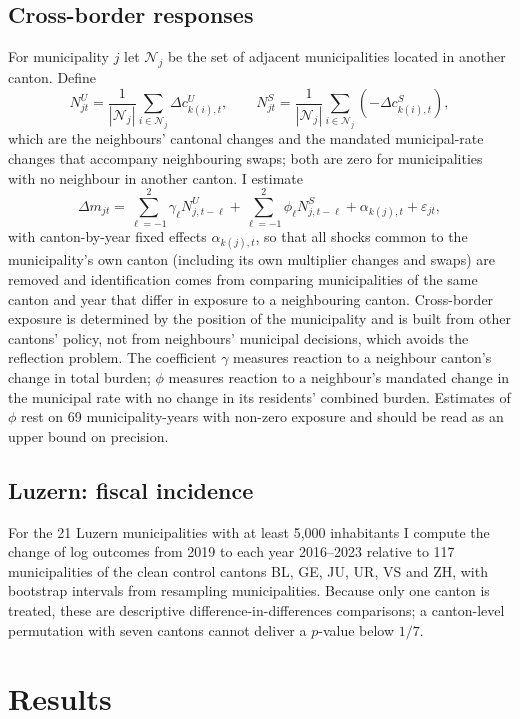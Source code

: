 \documentclass[11pt,a4paper]{article}
\begin{document}
\subsection{Cross-border responses}
For municipality $j$ let $\mathcal N_j$ be the set of adjacent municipalities located in another canton. Define
\[
N^{U}_{jt}=\frac{1}{|\mathcal N_j|}\sum_{i\in\mathcal N_j}\Delta c^{U}_{k(i),t},\qquad N^{S}_{jt}=\frac{1}{|\mathcal N_j|}\sum_{i\in\mathcal N_j}\left(-\Delta c^{S}_{k(i),t}\right),
\]
which are the neighbours' cantonal changes and the mandated municipal-rate changes that accompany neighbouring swaps; both are zero for municipalities with no neighbour in another canton. I estimate
\begin{equation}
\Delta m_{jt}=\sum_{\ell=-1}^{2}\gamma_\ell N^{U}_{j,t-\ell}+\sum_{\ell=-1}^{2}\phi_\ell N^{S}_{j,t-\ell}+\alpha_{k(j),t}+\varepsilon_{jt},
\label{eq:sp}
\end{equation}
with canton-by-year fixed effects $\alpha_{k(j),t}$, so that all shocks common to the municipality's own canton (including its own multiplier changes and swaps) are removed and identification comes from comparing municipalities of the same canton and year that differ in exposure to a neighbouring canton. Cross-border exposure is determined by the position of the municipality and is built from other cantons' policy, not from neighbours' municipal decisions, which avoids the reflection problem. The coefficient $\gamma$ measures reaction to a neighbour canton's change in total burden; $\phi$ measures reaction to a neighbour's mandated change in the municipal rate with no change in its residents' combined burden. Estimates of $\phi$ rest on 69 municipality-years with non-zero exposure and should be read as an upper bound on precision.

\subsection{Luzern: fiscal incidence}
For the 21 Luzern municipalities with at least 5,000 inhabitants I compute the change of log outcomes from 2019 to each year 2016--2023 relative to 117 municipalities of the clean control cantons BL, GE, JU, UR, VS and ZH, with bootstrap intervals from resampling municipalities. Because only one canton is treated, these are descriptive difference-in-differences comparisons; a canton-level permutation with seven cantons cannot deliver a $p$-value below $1/7$.

\section{Results}\label{sec:results}
\end{document}
